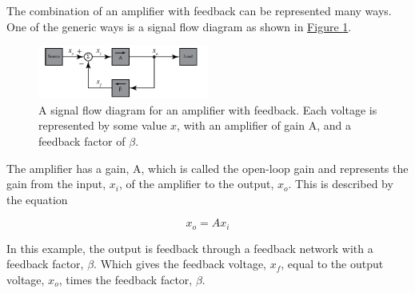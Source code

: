 

The combination of an amplifier with feedback can be represented many ways. One of the generic ways is a signal flow diagram as shown in \hyperref[fig:4sigflow]{Figure \ref*{fig:4sigflow}}. 

\begin{figure} [h]
	\centering
		\includegraphics[width=0.5\textwidth]{Lab4signalflow.pdf}
	\caption{A signal flow diagram for an amplifier with feedback. Each voltage is represented by some value $x$, with an amplifier of gain A, and a feedback factor of $\beta$.} \label{fig:4sigflow}
\end{figure}

The amplifier has a gain, A, which is called the open-loop gain and represents the gain from the input, $x_i$, of the amplifier to the output, $x_o$. This is described by the equation

\begin{equation}
	x_o = A x_i
\end{equation}

\noindent In this example, the output is feedback through a feedback network with a feedback factor, $\beta$. Which gives the feedback voltage, $x_f$, equal to the output voltage, $x_o$, times the feedback factor, $\beta$.

